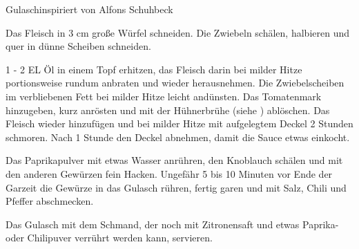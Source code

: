 \begin{recipe}{Gulasch}{inspiriert von Alfons Schuhbeck}
  \label{Gulasch}
  \inglist

  \steps
  Das Fleisch in 3 cm große Würfel schneiden. Die Zwiebeln schälen, halbieren und quer in
  dünne Scheiben schneiden.

  1 - 2 EL Öl in einem Topf erhitzen, das Fleisch darin bei milder Hitze portionsweise
  rundum anbraten und wieder herausnehmen. Die Zwiebelscheiben im verbliebenen Fett bei
  milder Hitze leicht andünsten. Das Tomatenmark hinzugeben, kurz anrösten und mit der
  Hühnerbrühe (siehe \pageref{Gefluegelfond}) ablöschen. Das Fleisch wieder hinzufügen und
  bei milder Hitze mit aufgelegtem Deckel 2 Stunden schmoren. Nach 1 Stunde den Deckel
  abnehmen, damit die Sauce etwas einkocht.

  Das Paprikapulver mit etwas Wasser anrühren, den Knoblauch schälen und mit den anderen
  Gewürzen fein Hacken. Ungefähr 5 bis 10 Minuten vor Ende der Garzeit die Gewürze in das
  Gulasch rühren, fertig garen und mit Salz, Chili und Pfeffer abschmecken.

  Das Gulasch mit dem Schmand, der noch mit Zitronensaft und etwas Paprika- oder
  Chilipuver verrührt werden kann, servieren.
\end{recipe}
